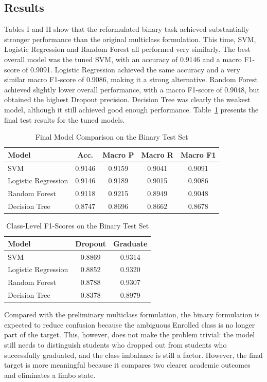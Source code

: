 \documentclass[lettersize,journal]{IEEEtran}
\begin{document}
\subsection{Results}
Tables I and II show that the reformulated binary task achieved substantially stronger performance than the original multiclass formulation. 
This time, SVM, Logistic Regression and Random Forest all performed very similarly. The best overall model was the tuned SVM, with an accuracy of 0.9146 and a macro F1-score of 0.9091. Logistic Regression achieved the same accuracy and a 
very similar macro F1-score of 0.9086, making it a strong alternative. Random Forest achieved slightly lower overall performance, 
with a macro F1-score of 0.9048, but obtained the highest Dropout precision. Decision Tree was clearly the weakest model, although it still achieved 
good enough performance.
Table~\ref{tab:model_comparison} presents the final test results for the tuned models.
\begin{table}[!t]
\caption{Final Model Comparison on the Binary Test Set}
\label{tab:model_comparison}
\centering
\footnotesize
\begin{tabular}{lcccc}
\toprule
Model & Acc. & Macro P & Macro R & Macro F1 \\
\midrule
SVM & 0.9146 & 0.9159 & 0.9041 & 0.9091 \\
Logistic Regression & 0.9146 & 0.9189 & 0.9015 & 0.9086 \\
Random Forest & 0.9118 & 0.9215 & 0.8949 & 0.9048 \\
Decision Tree & 0.8747 & 0.8696 & 0.8662 & 0.8678 \\
\bottomrule
\end{tabular}
\end{table}

\begin{table}[!t]
\caption{Class-Level F1-Scores on the Binary Test Set}
\label{tab:class_f1}
\centering
\footnotesize
\begin{tabular}{lcc}
\toprule
Model & Dropout & Graduate \\
\midrule
SVM & 0.8869 & 0.9314 \\
Logistic Regression & 0.8852 & 0.9320 \\
Random Forest & 0.8788 & 0.9307 \\
Decision Tree & 0.8378 & 0.8979 \\
\bottomrule
\end{tabular}
\end{table}

Compared with the preliminary multiclass formulation, the binary formulation is expected to reduce confusion because the ambiguous Enrolled class is no 
longer part of the target. This, however, does not make the problem trivial: the model still needs to distinguish students who dropped out from students 
who successfully graduated, and the class imbalance is still a factor. However, the final target is more meaningful because it compares two clearer academic outcomes and eliminates a limbo state.
\end{document}
